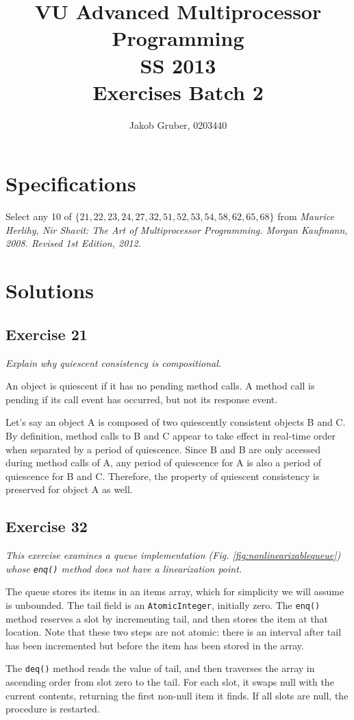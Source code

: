 \documentclass[a4paper,10pt]{article}
\title{VU Advanced Multiprocessor Programming \\
       SS 2013 \\
       Exercises Batch 2}
\author{Jakob Gruber, 0203440}
\begin{document}
\maketitle

\tableofcontents

\pagebreak

\section{Specifications}

Select any 10 of $\{21, 22, 23, 24, 27, 32, 51, 52, 53, 54, 58, 62, 65, 68\}$ 
from \emph{Maurice Herlihy, Nir Shavit: The Art of Multiprocessor Programming. 
Morgan Kaufmann, 2008. Revised 1st Edition, 2012.}

\section{Solutions}

\subsection{Exercise 21}

\emph{Explain why quiescent consistency is compositional.}

\vspace{3mm}

An object is quiescent if it has no pending method calls. A method call is pending if
its call event has occurred, but not its response event.

Let's say an object A is composed of two quiescently consistent objects B and C.
By definition, method calls to B and C appear to take effect in real-time order when
separated by a period of quiescence. Since B and B are only accessed during method calls of
A, any period of quiescence for A is also a period of quiescence for B and C. Therefore,
the property of quiescent consistency is preserved for object A as well.

\subsection{Exercise 32}

{\itshape
This exercise examines a queue implementation (Fig. \ref{fig:nonlinearizablequeue}) whose
\lstinline|enq()| method does not have a linearization point.

The queue stores its items in an items array, which for simplicity we will
assume is unbounded. The tail field is an \lstinline|AtomicInteger|, initially zero. The
\lstinline|enq()| method reserves a slot by incrementing tail, and then stores the item at
that location. Note that these two steps are not atomic: there is an interval after
tail has been incremented but before the item has been stored in the array.

The \lstinline|deq()| method reads the value of tail, and then traverses the array in
ascending order from slot zero to the tail. For each slot, it swaps null with the
current contents, returning the first non-null item it finds. If all slots are null, the
procedure is restarted.}
\end{document}
